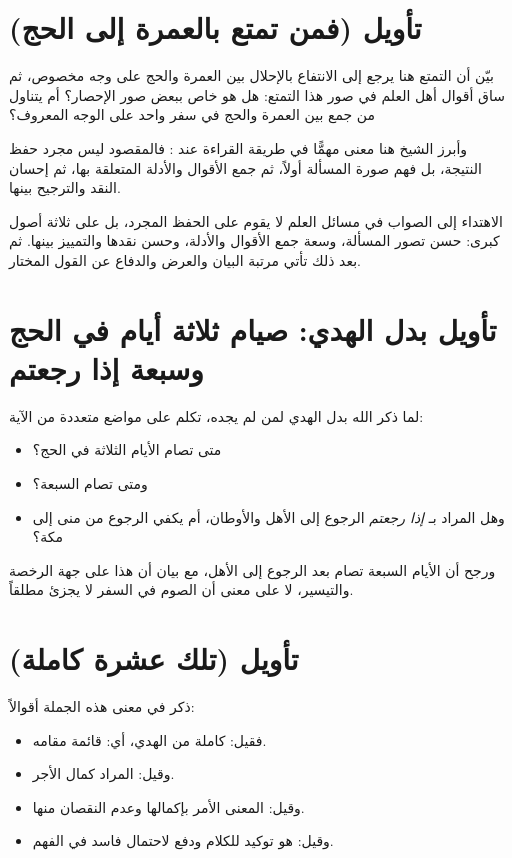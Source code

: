 \separator

\section{تأويل (فمن تمتع بالعمرة إلى الحج)}
بيّن  أن التمتع هنا يرجع إلى الانتفاع بالإحلال بين العمرة والحج على وجه مخصوص، ثم ساق أقوال أهل العلم في صور هذا التمتع: هل هو خاص ببعض صور الإحصار؟ أم يتناول من جمع بين العمرة والحج في سفر واحد على الوجه المعروف؟

وأبرز الشيخ هنا معنى مهمًّا في طريقة القراءة عند : فالمقصود ليس مجرد حفظ النتيجة، بل فهم صورة المسألة أولاً، ثم جمع الأقوال والأدلة المتعلقة بها، ثم إحسان النقد والترجيح بينها.

\begin{fawaid}
الاهتداء إلى الصواب في مسائل العلم لا يقوم على الحفظ المجرد، بل على ثلاثة أصول كبرى: حسن تصور المسألة، وسعة جمع الأقوال والأدلة، وحسن نقدها والتمييز بينها. ثم بعد ذلك تأتي مرتبة البيان والعرض والدفاع عن القول المختار.
\end{fawaid}

\section{تأويل بدل الهدي: صيام ثلاثة أيام في الحج وسبعة إذا رجعتم}
لما ذكر الله بدل الهدي لمن لم يجده، تكلم  على مواضع متعددة من الآية:
\begin{itemize}
    \item متى تصام الأيام الثلاثة في الحج؟
    \item ومتى تصام السبعة؟
    \item وهل المراد بـ \textit{إذا رجعتم} الرجوع إلى الأهل والأوطان، أم يكفي الرجوع من منى إلى مكة؟
\end{itemize}

ورجح أن الأيام السبعة تصام بعد الرجوع إلى الأهل، مع بيان أن هذا على جهة الرخصة والتيسير، لا على معنى أن الصوم في السفر لا يجزئ مطلقاً.

\section{تأويل (تلك عشرة كاملة)}
ذكر  في معنى هذه الجملة أقوالاً:
\begin{itemize}
    \item فقيل: كاملة من الهدي، أي: قائمة مقامه.
    \item وقيل: المراد كمال الأجر.
    \item وقيل: المعنى الأمر بإكمالها وعدم النقصان منها.
    \item وقيل: هو توكيد للكلام ودفع لاحتمال فاسد في الفهم.
\end{itemize}

